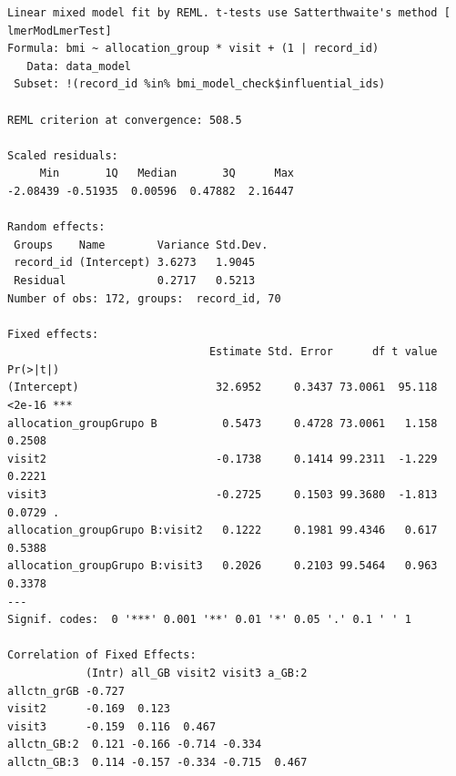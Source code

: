 \documentclass[
  letterpaper,
  DIV=11,
  numbers=noendperiod]{scrartcl}
\newenvironment{Shaded}{\begin{snugshade}}{\end{snugshade}}
\newcommand{\NormalTok}[1]{\textcolor[rgb]{0.00,0.23,0.31}{#1}}
\newcommand{\SpecialCharTok}[1]{\textcolor[rgb]{0.37,0.37,0.37}{#1}}
\begin{document}
\begin{verbatim}
Linear mixed model fit by REML. t-tests use Satterthwaite's method [
lmerModLmerTest]
Formula: bmi ~ allocation_group * visit + (1 | record_id)
   Data: data_model
 Subset: !(record_id %in% bmi_model_check$influential_ids)

REML criterion at convergence: 508.5

Scaled residuals: 
     Min       1Q   Median       3Q      Max 
-2.08439 -0.51935  0.00596  0.47882  2.16447 

Random effects:
 Groups    Name        Variance Std.Dev.
 record_id (Intercept) 3.6273   1.9045  
 Residual              0.2717   0.5213  
Number of obs: 172, groups:  record_id, 70

Fixed effects:
                               Estimate Std. Error      df t value Pr(>|t|)    
(Intercept)                     32.6952     0.3437 73.0061  95.118   <2e-16 ***
allocation_groupGrupo B          0.5473     0.4728 73.0061   1.158   0.2508    
visit2                          -0.1738     0.1414 99.2311  -1.229   0.2221    
visit3                          -0.2725     0.1503 99.3680  -1.813   0.0729 .  
allocation_groupGrupo B:visit2   0.1222     0.1981 99.4346   0.617   0.5388    
allocation_groupGrupo B:visit3   0.2026     0.2103 99.5464   0.963   0.3378    
---
Signif. codes:  0 '***' 0.001 '**' 0.01 '*' 0.05 '.' 0.1 ' ' 1

Correlation of Fixed Effects:
            (Intr) all_GB visit2 visit3 a_GB:2
allctn_grGB -0.727                            
visit2      -0.169  0.123                     
visit3      -0.159  0.116  0.467              
allctn_GB:2  0.121 -0.166 -0.714 -0.334       
allctn_GB:3  0.114 -0.157 -0.334 -0.715  0.467
\end{verbatim}

\begin{Shaded}
\end{Shaded}
\end{document}
